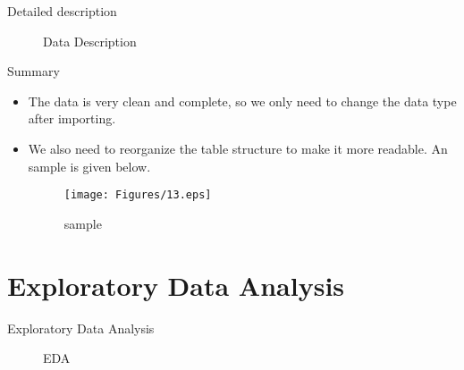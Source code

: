 \documentclass[
 size=12pt,
 paper=smartboard, %
 mode=present, %
 display=slides, %
 style=tuliplab,  %
 pauseslide,
 fleqn,leqno,clock]{powerdot}
\begin{document}
\begin{slide}{Detailed description}
  \begin{figure}[htbp]
    \centering
    \quad
    \quad
    \quad
    \quad
    \caption{Data Description}
  \end{figure}
\end{slide}

\begin{slide}{Summary}
  \begin{itemize}
    \item
          The data is very clean and complete,
          so we only need to change the data type after importing.
    \item
          We also need to reorganize the table structure to make it more readable.
          An sample is given below.
          \begin{figure}
            \centering
            \texttt{[image: Figures/13.eps]}
            \caption{sample}
            \label{sample}
          \end{figure}
  \end{itemize}
\end{slide}

\section{Exploratory Data Analysis}

\begin{slide}{Exploratory Data Analysis}
  \begin{figure}[htbp]
    \centering
    \quad
    \quad
    \caption{EDA}
  \end{figure}
\end{slide}
\end{document}
